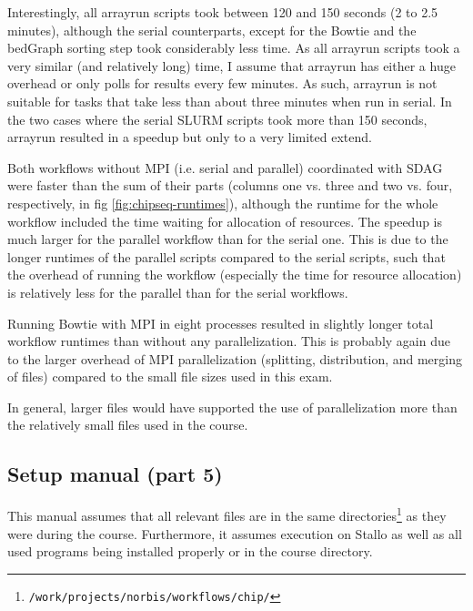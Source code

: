 \documentclass[paper=a4, 12pt]{scrartcl}
\begin{document}
Interestingly, all arrayrun scripts took between 120 and 150 seconds (2 to 2.5 minutes), although the serial counterparts, except for the Bowtie and the bedGraph sorting step took considerably less time. As all arrayrun scripts took a very similar (and relatively long) time, I assume that arrayrun has either a huge overhead or only polls for results every few minutes. As such, arrayrun is not suitable for tasks that take less than about three minutes when run in serial. In the two cases where the serial SLURM scripts took more than 150 seconds, arrayrun resulted in a speedup but only to a very limited extend.

Both workflows without MPI (i.e. serial and parallel) coordinated with SDAG were faster than the sum of their parts (columns one vs. three and two vs. four, respectively, in fig \ref{fig:chipseq-runtimes}), although the runtime for the whole workflow included the time waiting for allocation of resources. The speedup is much larger for the parallel workflow than for the serial one. This is due to the longer runtimes of the parallel scripts compared to the serial scripts, such that the overhead of running the workflow (especially the time for resource allocation) is relatively less for the parallel than for the serial workflows.

Running Bowtie with MPI in eight processes resulted in slightly longer total workflow runtimes than without any parallelization. This is probably again due to the larger overhead of MPI parallelization (splitting, distribution, and merging of files) compared to the small file sizes used in this exam.

In general, larger files would have supported the use of parallelization more than the relatively small files used in the course.

\subsection{Setup manual (part 5)}

This manual assumes that all relevant files are in the same directories\footnote{\texttt{/work/}\allowbreak\texttt{projects/}\texttt{norbis/}\allowbreak\texttt{workflows/}\allowbreak\texttt{chip/}} as they were during the course. Furthermore, it assumes execution on Stallo as well as all used programs being installed properly or in the course directory.
\end{document}
